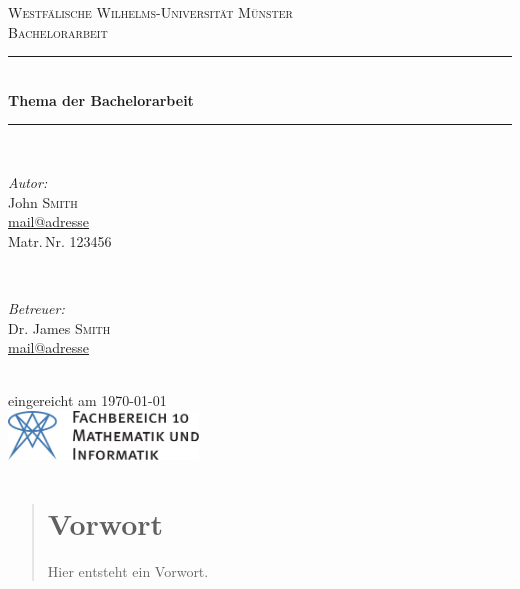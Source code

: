 


\begin{titlepage}
	\newcommand{\HRule}{\rule{\linewidth}{0.5mm}} %

	\center %
 

	\textsc{\LARGE Westfälische Wilhelms-Universität Münster}\\[1.5cm] %
	\textsc{\Large Bachelorarbeit}\\[0.5cm] %


	\HRule \\[0.4cm]
	{ \huge \sffamily\bfseries Thema der Bachelorarbeit}\\[0.4cm] %
	\HRule \\[1.5cm]
 

	\begin{minipage}{0.4\textwidth}
	\begin{flushleft} \large
	\emph{Autor:}\\
	John \textsc{Smith}\\ %
	\normalsize \url{mail@adresse}\\
	Matr.\,Nr. 123456
	\end{flushleft}
	\end{minipage}
	~
	\begin{minipage}{0.4\textwidth}
	\begin{flushright} \large
	\emph{Betreuer:} \\
	Dr. James \textsc{Smith}\\ %
	\normalsize \url{mail@adresse}
	\end{flushright}
	\end{minipage}\\[4cm]

	{\large eingereicht am \today}\\[3cm] %


	\includegraphics[height=1.3cm,keepaspectratio]{Bilder/fb10logo.pdf}\\[1cm] %
 

	\vfill %
	
\end{titlepage}
\begin{abstract}
\section*{Vorwort}
Hier entsteht ein Vorwort.
\end{abstract}
\tableofcontents
\cleardoubleoddemptypage
{}
\setcounter{page}{1}

